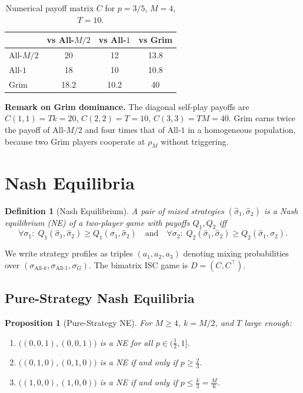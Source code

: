 \documentclass[12pt,a4paper]{article}
\newtheorem{definition}{Definition}[section]
\newtheorem{proposition}{Proposition}[section]
\begin{document}
\begin{table}[H]
\centering
\caption{Numerical payoff matrix $C$ for $p=3/5$, $M=4$, $T=10$.}
\label{tab:C_p060}
\begin{tabular}{lccc}
\toprule
           & vs All-$M/2$ & vs All-$1$ & vs Grim \\
\midrule
All-$M/2$  & 20    & 12    & 13.8   \\
All-$1$    & 18    & 10    & 10.8   \\
Grim       & 18.2  & 10.2  & 40     \\
\bottomrule
\end{tabular}
\end{table}

\noindent\textbf{Remark on Grim dominance.}  The diagonal self-play payoffs are
$C(1,1)=Tk=20$, $C(2,2)=T=10$, $C(3,3)=TM=40$. Grim earns twice the payoff
of All-$M/2$ and four times that of All-$1$ in a homogeneous population,
because two Grim players cooperate at $\rho_M$ without triggering.

\section{Nash Equilibria}
\label{sec:NE}

\begin{definition}[Nash Equilibrium]
A pair of mixed strategies $(\hat\sigma_1,\hat\sigma_2)$ is a \emph{Nash
equilibrium} (NE) of a two-player game with payoffs $Q_1,Q_2$ iff
\[
  \forall\sigma_1:\; Q_1(\hat\sigma_1,\hat\sigma_2)\geq Q_1(\sigma_1,\hat\sigma_2)
  \quad\text{and}\quad
  \forall\sigma_2:\; Q_2(\hat\sigma_1,\hat\sigma_2)\geq Q_2(\hat\sigma_1,\sigma_2).
\]
\end{definition}

We write strategy profiles as triples $(a_1,a_2,a_3)$ denoting mixing
probabilities over $(\sigma_{\text{All-}k},\sigma_{\text{All-}1},\sigma_G)$.
The bimatrix ISC game is $D=(C,C^\top)$.

\subsection{Pure-Strategy Nash Equilibria}

\begin{proposition}[Pure-Strategy NE]\label{prop:pure_NE}
For $M\geq 4$, $k=M/2$, and $T$ large enough:
\begin{enumerate}
  \item $\bigl((0,0,1),(0,0,1)\bigr)$ is a NE for all $p\in(\tfrac{1}{2},1]$.
  \item $\bigl((0,1,0),(0,1,0)\bigr)$ is a NE if and only if $p\geq\tfrac{2}{3}$.
  \item $\bigl((1,0,0),(1,0,0)\bigr)$ is a NE if and only if $p\leq \tfrac{k}{3}=\tfrac{M}{6}$.
\end{enumerate}
\end{proposition}
\end{document}
